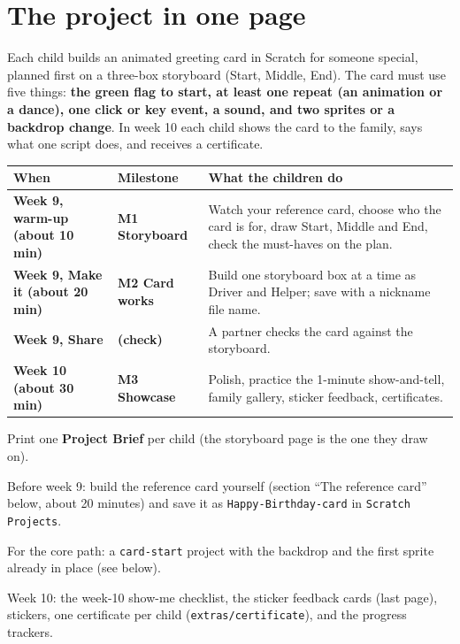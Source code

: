 \documentclass[track=junior,level=1,teacher]{kidscode}
\begin{document}
\tableofcontents

\section{The project in one page}
Each child builds an animated greeting card in Scratch for someone special, planned first on a
three-box storyboard (Start, Middle, End). The card must use five things: \textbf{the green flag to
start, at least one repeat (an animation or a dance), one click or key event, a sound, and two
sprites or a backdrop change}. In week 10 each child shows the card to the family, says what one
script does, and receives a certificate.

\begin{center}\small\renewcommand{\arraystretch}{1.35}
\begin{tabularx}{\linewidth}{@{}>{\bfseries\RaggedRight}p{3.0cm}>{\bfseries\RaggedRight}p{3.0cm}X@{}}
\toprule
When & Milestone & What the children do\\
\midrule
Week 9, warm-up (about 10 min) & M1 Storyboard & Watch your reference card, choose who the card is for, draw Start, Middle and End, check the must-haves on the plan.\\
Week 9, Make it (about 20 min) & M2 Card works & Build one storyboard box at a time as Driver and Helper; save with a nickname file name.\\
Week 9, Share & (check) & A partner checks the card against the storyboard.\\
Week 10 (about 30 min) & M3 Showcase & Polish, practice the 1-minute show-and-tell, family gallery, sticker feedback, certificates.\\
\bottomrule
\end{tabularx}
\end{center}

\begin{materials}
  \item Print one \textbf{Project Brief} per child (the storyboard page is the one they draw on).
  \item Before week 9: build the reference card yourself (section \enquote{The reference card} below,
        about 20 minutes) and save it as \texttt{Happy-Birthday-card} in \texttt{Scratch Projects}.
  \item For the core path: a \texttt{card-start} project with the backdrop and the first sprite already in place (see below).
  \item Week 10: the week-10 show-me checklist, the sticker feedback cards (last page), stickers,
        one certificate per child (\texttt{extras/\allowbreak{}certificate}), and the progress trackers.
\end{materials}
\end{document}
